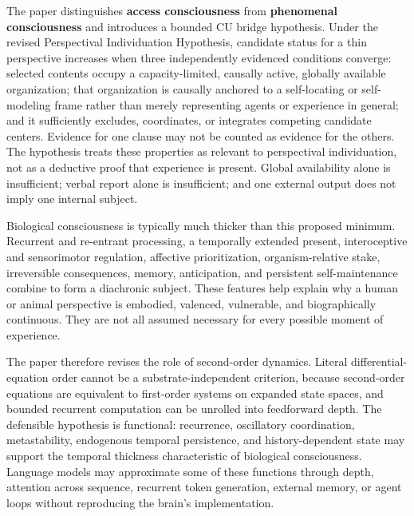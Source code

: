 \documentclass[
  11pt,
]{article}
\begin{document}
The paper distinguishes \textbf{access consciousness} from
\textbf{phenomenal consciousness} and introduces a bounded CU bridge
hypothesis. Under the revised Perspectival Individuation Hypothesis,
candidate status for a thin perspective increases when three
independently evidenced conditions converge: selected contents occupy a
capacity-limited, causally active, globally available organization; that
organization is causally anchored to a self-locating or self-modeling
frame rather than merely representing agents or experience in general;
and it sufficiently excludes, coordinates, or integrates competing
candidate centers. Evidence for one clause may not be counted as
evidence for the others. The hypothesis treats these properties as
relevant to perspectival individuation, not as a deductive proof that
experience is present. Global availability alone is insufficient; verbal
report alone is insufficient; and one external output does not imply one
internal subject.

Biological consciousness is typically much thicker than this proposed
minimum. Recurrent and re-entrant processing, a temporally extended
present, interoceptive and sensorimotor regulation, affective
prioritization, organism-relative stake, irreversible consequences,
memory, anticipation, and persistent self-maintenance combine to form a
diachronic subject. These features help explain why a human or animal
perspective is embodied, valenced, vulnerable, and biographically
continuous. They are not all assumed necessary for every possible moment
of experience.

The paper therefore revises the role of second-order dynamics. Literal
differential-equation order cannot be a substrate-independent criterion,
because second-order equations are equivalent to first-order systems on
expanded state spaces, and bounded recurrent computation can be unrolled
into feedforward depth. The defensible hypothesis is functional:
recurrence, oscillatory coordination, metastability, endogenous temporal
persistence, and history-dependent state may support the temporal
thickness characteristic of biological consciousness. Language models
may approximate some of these functions through depth, attention across
sequence, recurrent token generation, external memory, or agent loops
without reproducing the brain's implementation.
\end{document}
